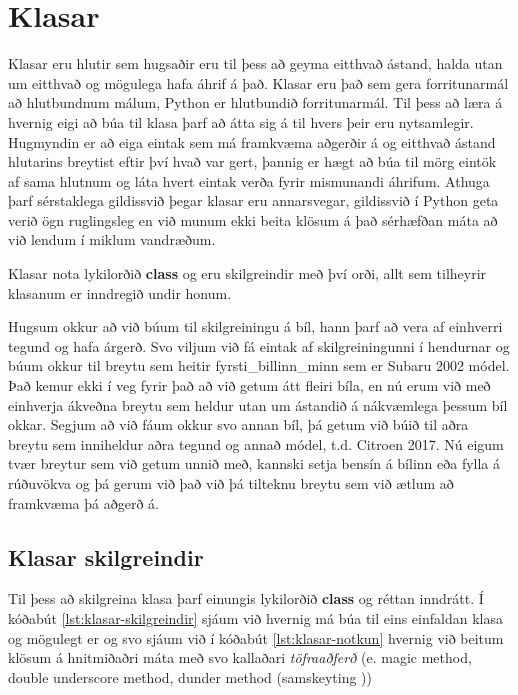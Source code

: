 
\chapter{Klasar}\label{k:klasar}
Klasar eru hlutir sem hugsaðir eru til þess að geyma eitthvað ástand, halda utan um eitthvað og mögulega hafa áhrif á það.
Klasar eru það sem gera forritunarmál að hlutbundnum málum, Python er hlutbundið forritunarmál.
Til þess að læra á hvernig eigi að búa til klasa þarf að átta sig á til hvers þeir eru nytsamlegir.
Hugmyndin er að eiga eintak sem má framkvæma aðgerðir á og eitthvað ástand hlutarins breytist eftir því hvað var gert, þannig er hægt að búa til mörg eintök af sama hlutnum og láta hvert eintak verða fyrir mismunandi áhrifum.
Athuga þarf sérstaklega gildissvið þegar klasar eru annarsvegar, gildissvið í Python geta verið ögn ruglingsleg en við munum ekki beita klösum á það sérhæfðan máta að við lendum í miklum vandræðum.

Klasar nota lykilorðið \textbf{class} og eru skilgreindir með því orði, allt sem tilheyrir klasanum er inndregið undir honum.

Hugsum okkur að við búum til skilgreiningu á bíl, hann þarf að vera af einhverri tegund og hafa árgerð.
Svo viljum við fá eintak af skilgreiningunni í hendurnar og búum okkur til breytu sem heitir fyrsti\_billinn\_minn sem er Subaru 2002 módel.
Það kemur ekki í veg fyrir það að við getum átt fleiri bíla, en nú erum við með einhverja ákveðna breytu sem heldur utan um ástandið á nákvæmlega þessum bíl okkar.
Segjum að við fáum okkur svo annan bíl, þá getum við búið til aðra breytu sem inniheldur aðra tegund og annað módel, t.d. Citroen 2017.
Nú eigum tvær breytur sem við getum unnið með, kannski setja bensín á bílinn eða fylla á rúðuvökva og þá gerum við það við þá tilteknu breytu sem við ætlum að framkvæma þá aðgerð á.


\section{Klasar skilgreindir}\label{uk:klasar-skilgreindir}
Til þess að skilgreina klasa þarf einungis lykilorðið \textbf{class} og réttan inndrátt.
Í kóðabút \ref{lst:klasar-skilgreindir} sjáum við hvernig má búa til eins einfaldan klasa og mögulegt er og svo sjáum við í kóðabút \ref{lst:klasar-notkun} hvernig við beitum klösum á hnitmiðaðri máta með svo kallaðari \textit{töfraaðferð} (e. magic method, double underscore method, dunder method (samskeyting ))

